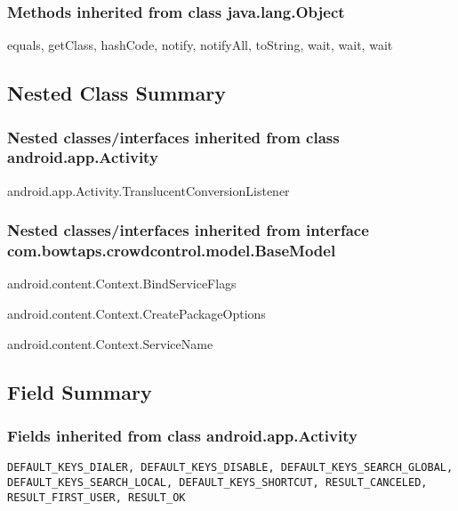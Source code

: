 \subsubsection{Methods inherited from class java.lang.Object}

equals, getClass, hashCode, notify, notifyAll, toString, wait, wait, wait\\


\subsection{Nested Class Summary}

\subsubsection{Nested classes/interfaces inherited from class android.app.Activity}
\begin{DoxyCompactItemize}
\item  android.app.Activity.TranslucentConversionListener
\end{DoxyCompactItemize} 

\subsubsection{Nested classes/interfaces inherited from interface com.bowtaps.crowdcontrol.model.BaseModel}
\begin{DoxyCompactItemize}
\item  android.content.Context.BindServiceFlags
\item  android.content.Context.CreatePackageOptions
\item android.content.Context.ServiceName
\end{DoxyCompactItemize} 

\subsection{Field Summary}

\subsubsection{Fields inherited from class android.app.Activity}
\begin{lstlisting}
DEFAULT_KEYS_DIALER, DEFAULT_KEYS_DISABLE, DEFAULT_KEYS_SEARCH_GLOBAL, DEFAULT_KEYS_SEARCH_LOCAL, DEFAULT_KEYS_SHORTCUT, RESULT_CANCELED, RESULT_FIRST_USER, RESULT_OK
\end{lstlisting}
